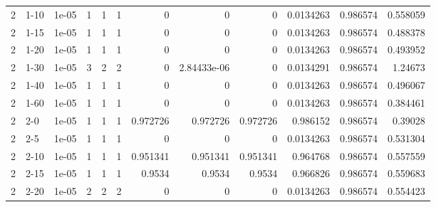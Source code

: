 \begin{tabular}{rlrrrrrrrrrr}
     2 & 1-10   &      1e-05 &           1 &                 1 &                 1 &     0           &     0           &      0           &        0.0134263 &               0.986574 &           0.558059 \\
     2 & 1-15   &      1e-05 &           1 &                 1 &                 1 &     0           &     0           &      0           &        0.0134263 &               0.986574 &           0.488378 \\
     2 & 1-20   &      1e-05 &           1 &                 1 &                 1 &     0           &     0           &      0           &        0.0134263 &               0.986574 &           0.493952 \\
     2 & 1-30   &      1e-05 &           3 &                 2 &                 2 &     0           &     2.84433e-06 &      0           &        0.0134291 &               0.986574 &           1.24673  \\
     2 & 1-40   &      1e-05 &           1 &                 1 &                 1 &     0           &     0           &      0           &        0.0134263 &               0.986574 &           0.496067 \\
     2 & 1-60   &      1e-05 &           1 &                 1 &                 1 &     0           &     0           &      0           &        0.0134263 &               0.986574 &           0.384461 \\
     2 & 2-0    &      1e-05 &           1 &                 1 &                 1 &     0.972726    &     0.972726    &      0.972726    &        0.986152  &               0.986574 &           0.39028  \\
     2 & 2-5    &      1e-05 &           1 &                 1 &                 1 &     0           &     0           &      0           &        0.0134263 &               0.986574 &           0.531304 \\
     2 & 2-10   &      1e-05 &           1 &                 1 &                 1 &     0.951341    &     0.951341    &      0.951341    &        0.964768  &               0.986574 &           0.557559 \\
     2 & 2-15   &      1e-05 &           1 &                 1 &                 1 &     0.9534      &     0.9534      &      0.9534      &        0.966826  &               0.986574 &           0.559683 \\
     2 & 2-20   &      1e-05 &           2 &                 2 &                 2 &     0           &     0           &      0           &        0.0134263 &               0.986574 &           0.554423 \\

\end{tabular}
